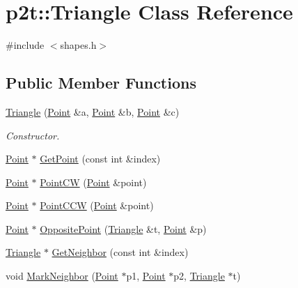 \hypertarget{classp2t_1_1_triangle}{}\section{p2t\+:\+:Triangle Class Reference}
\label{classp2t_1_1_triangle}


{\ttfamily \#include $<$shapes.\+h$>$}

\subsection*{Public Member Functions}
\begin{DoxyCompactItemize}
\item 
\hyperlink{classp2t_1_1_triangle_a9f057674cc3e7c0ed28c8e1237f55bea}{Triangle} (\hyperlink{structp2t_1_1_point}{Point} \&a, \hyperlink{structp2t_1_1_point}{Point} \&b, \hyperlink{structp2t_1_1_point}{Point} \&c)
\begin{DoxyCompactList}\small\item\em Constructor. \end{DoxyCompactList}\item 
\hyperlink{structp2t_1_1_point}{Point} $\ast$ \hyperlink{classp2t_1_1_triangle_a3cb89e5408bd4d35194ee6e179ad6df4}{Get\+Point} (const int \&index)
\item 
\hyperlink{structp2t_1_1_point}{Point} $\ast$ \hyperlink{classp2t_1_1_triangle_a5b91de7beebeedd89d3ecbb984dbb5bf}{Point\+C\+W} (\hyperlink{structp2t_1_1_point}{Point} \&point)
\item 
\hyperlink{structp2t_1_1_point}{Point} $\ast$ \hyperlink{classp2t_1_1_triangle_a8522e2b9fcc5f27dd27bb6c7c3eea515}{Point\+C\+C\+W} (\hyperlink{structp2t_1_1_point}{Point} \&point)
\item 
\hyperlink{structp2t_1_1_point}{Point} $\ast$ \hyperlink{classp2t_1_1_triangle_a1bf7aa95b095936c6973d8f84f55d880}{Opposite\+Point} (\hyperlink{classp2t_1_1_triangle}{Triangle} \&t, \hyperlink{structp2t_1_1_point}{Point} \&p)
\item 
\hyperlink{classp2t_1_1_triangle}{Triangle} $\ast$ \hyperlink{classp2t_1_1_triangle_a8c3e2865d875d656b8f1d4c8004ca7c3}{Get\+Neighbor} (const int \&index)
\item 
void \hyperlink{classp2t_1_1_triangle_abc085307796eddc8e56a4502244f23e3}{Mark\+Neighbor} (\hyperlink{structp2t_1_1_point}{Point} $\ast$p1, \hyperlink{structp2t_1_1_point}{Point} $\ast$p2, \hyperlink{classp2t_1_1_triangle}{Triangle} $\ast$t)
\item 

\end{DoxyCompactItemize}
